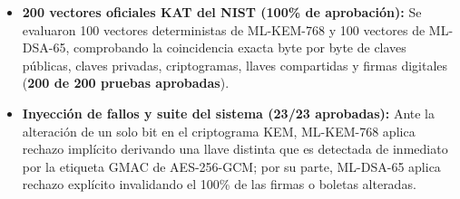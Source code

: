 \begin{itemize}
	\item \textbf{200 vectores oficiales KAT del NIST (100\% de aprobación):} Se evaluaron 100 vectores deterministas de ML-KEM-768 y 100 vectores de ML-DSA-65, comprobando la coincidencia exacta byte por byte de claves públicas, claves privadas, criptogramas, llaves compartidas y firmas digitales (\textbf{200 de 200 pruebas aprobadas}).
	\item \textbf{Inyección de fallos y suite del sistema (23/23 aprobadas):} Ante la alteración de un solo bit en el criptograma KEM, ML-KEM-768 aplica rechazo implícito derivando una llave distinta que es detectada de inmediato por la etiqueta GMAC de AES-256-GCM; por su parte, ML-DSA-65 aplica rechazo explícito invalidando el 100\% de las firmas o boletas alteradas.
\end{itemize}
